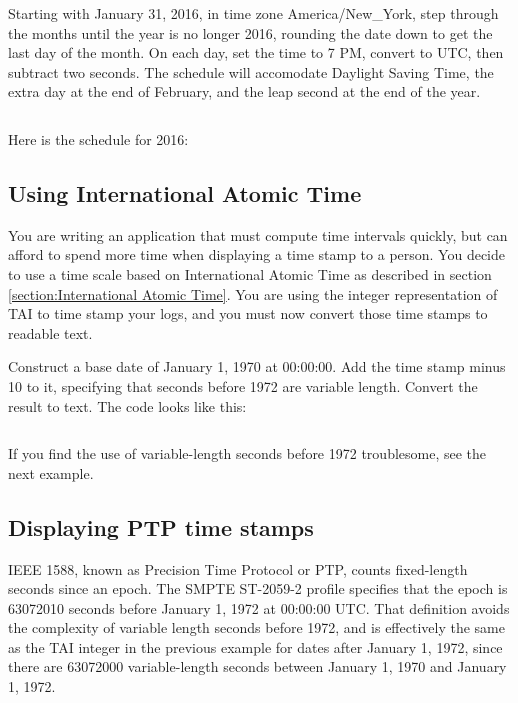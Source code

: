 \documentclass[letterpaper,twoside]{article}
\begin{document}
Starting with January 31, 2016, in time zone America/New\_York,
step through the months until the year is no longer 2016, rounding
the date down to get the last day of the month.
On each day, set the time to 7 PM, convert to UTC, then subtract
two seconds.  The schedule will accomodate Daylight Saving Time,
the extra day at the end of February,
and the leap second at the end of the year.
\inputminted[firstline=45,lastline=81]{c}{examples/example_03.c}

Here is the schedule for 2016:


\subsection{Using International Atomic Time}
\label{example:TAI}
You are writing an application that must compute time intervals quickly,
but can afford to spend more time when displaying a time stamp to a person.
You decide to use a time scale based on International Atomic Time as described
in section \ref{section:International Atomic Time}.  You are using the
integer representation of TAI to time stamp your logs, and you must now convert
those time stamps to readable text.

Construct a base date of January 1, 1970 at 00:00:00.  Add the time stamp
minus 10 to it, specifying that seconds before 1972 are variable length.
Convert the result to text.  The code looks like this:
\inputminted[firstline=41,lastline=67]{c}{examples/example_04.c}

If you find the use of variable-length seconds before 1972 troublesome,
see the next example.

\subsection{Displaying PTP time stamps}
\label{example:PTP}
IEEE 1588, known as Precision Time Protocol or PTP, counts fixed-length
seconds since an epoch.  The SMPTE ST-2059-2 profile specifies that the epoch is
\num{63072010} seconds before January 1, 1972 at 00:00:00 UTC.  That definition
avoids the complexity of variable length seconds before 1972, and is
effectively the same as the TAI integer in the previous example
for dates after January 1, 1972, since there are \num{63072000}
variable-length seconds between January 1, 1970 and January 1, 1972.
\end{document}
